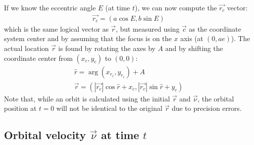 \begin{appendices}
\noindent
If we know the eccentric angle $E$ (at time $t$), we can now compute the $\vec{r_c}$ vector: 
\begin{eqnarray*}
\vec{r_c} = (a\cos{E}, b\sin{E})
\end{eqnarray*}
which is the same logical vector as $\vec{r}$, but measured using $\vec{c}$ as the coordinate system center and by assuming that the focus is on the $x$ axis (at $(0,ae)$). The actual location $\vec{r}$ is found by rotating the axes by $A$ and by shifting the coordinate center from $(x_c,y_c)$ to $(0,0)$:
\begin{eqnarray*}
\hat{r} = \arg(x_{r_c},y_{r_c}) + A\\
\vec{r} = (|\vec{r_c}|\cos{\hat{r}}+x_c,|\vec{r_c}|\sin{\hat{r}}+y_c)
\end{eqnarray*}
Note that, while an orbit is calculated using the initial $\vec{r}$ and $\vec{\nu}$, the orbital position at $t = 0$ will not be identical to the original $\vec{r}$ due to precision errors.

\subsection{Orbital velocity $\vec{\nu}$ at time $t$}


\end{appendices}
